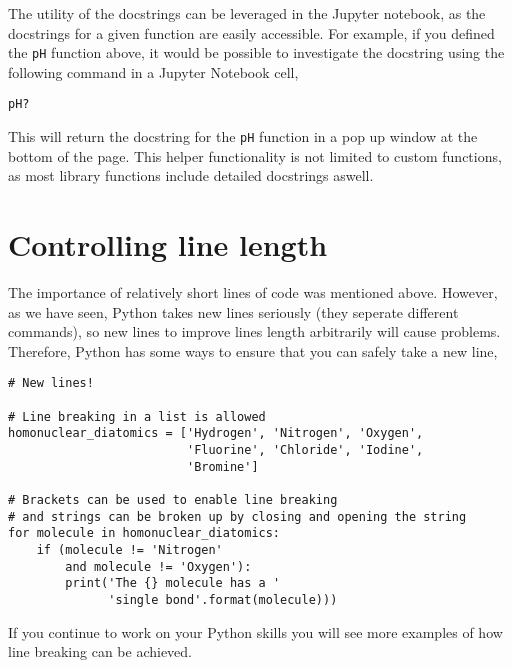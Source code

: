 \documentclass[a4paper]{article}
\begin{document}
The utility of the docstrings can be leveraged in the Jupyter notebook, as the docstrings for a given function are easily accessible.
For example, if you defined the \texttt{pH} function above, it would be possible to investigate the docstring using the following command in a Jupyter Notebook cell,
\begin{lstlisting}
pH?
\end{lstlisting}
This will return the docstring for the \texttt{pH} function in a pop up window at the bottom of the page.
This helper functionality is not limited to custom functions, as most library functions include detailed docstrings aswell.

\vspace{\baselineskip}
\begin{center}
	\noindent{}
\end{center}

\section{Controlling line length}
The importance of relatively short lines of code was mentioned above. 
However, as we have seen, Python takes new lines seriously (they seperate different commands), so new lines to improve lines length arbitrarily will cause problems. 
Therefore, Python has some ways to ensure that you can safely take a new line, 
\begin{lstlisting}
# New lines!

# Line breaking in a list is allowed
homonuclear_diatomics = ['Hydrogen', 'Nitrogen', 'Oxygen', 
                         'Fluorine', 'Chloride', 'Iodine', 
                         'Bromine']

# Brackets can be used to enable line breaking
# and strings can be broken up by closing and opening the string
for molecule in homonuclear_diatomics:
    if (molecule != 'Nitrogen' 
        and molecule != 'Oxygen'):
        print('The {} molecule has a '
              'single bond'.format(molecule)))
\end{lstlisting}
If you continue to work on your Python skills you will see more examples of how line breaking can be achieved. 
\end{document}
